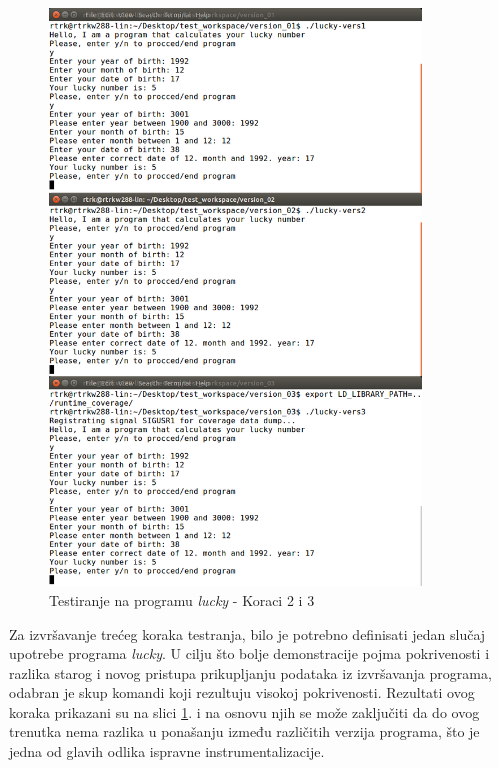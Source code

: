 \documentclass[12pt,oneside]{memoir}
\newcommand{\strano}[1]{\textit{#1}}
\begin{document}
\begin{figure}[!ht]
  \centering
  \includegraphics[width=0.88\textwidth]{img/lucky2-ng.png}
  \caption{Testiranje na programu \strano{lucky} - Koraci 2 i 3}
  \label{fig:lucky-test-2}
\end{figure}

Za izvršavanje trećeg koraka testranja, bilo je potrebno definisati jedan slučaj upotrebe programa \strano{lucky}. U cilju što bolje demonstracije pojma pokrivenosti i razlika starog i novog pristupa prikupljanju podataka iz izvršavanja programa, odabran je skup komandi koji rezultuju visokoj pokrivenosti. Rezultati ovog koraka prikazani su na slici \ref{fig:lucky-test-2}. i na osnovu njih se može zaključiti da do ovog trenutka nema razlika u ponašanju između različitih verzija programa, što je jedna od glavih odlika ispravne instrumentalizacije. 
\end{document}
